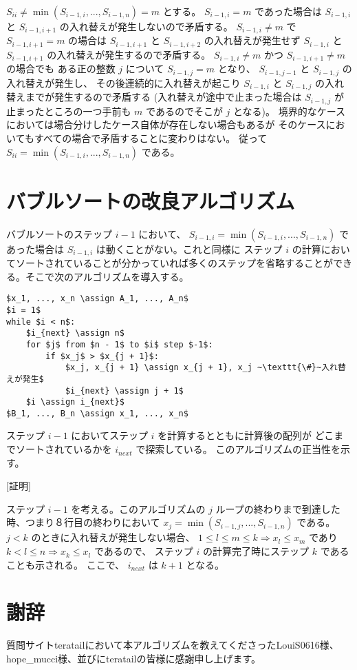 \documentclass{jsarticle}
\begin{document}
$S_{ii} \ne \min (S_{i-1, i}, ..., S_{i-1, n}) = m$ とする。
$S_{i-1, i} = m$ であった場合は
$S_{i-1, i}$ と $S_{i-1, i+1}$ の入れ替えが発生しないので矛盾する。
$S_{i-1, i} \ne m$ で $S_{i-1, i+1} = m$ の場合は
$S_{i-1, i+1}$ と $S_{i-1, i+2}$ の入れ替えが発生せず
$S_{i-1, i}$ と $S_{i-1, i+1}$ の入れ替えが発生するので矛盾する。
$S_{i-1, i} \ne m$ かつ $S_{i-1, i+1} \ne m$ の場合でも
ある正の整数 $j$ について $S_{i-1, j} = m$ となり、
$S_{i-1, j-1}$ と $S_{i-1, j}$ の入れ替えが発生し、
その後連続的に入れ替えが起こり
$S_{i-1, i}$ と $S_{i-1, j}$ の入れ替えまでが発生するので矛盾する
(入れ替えが途中で止まった場合は $S_{i-1, j}$ が止まったところの一つ手前も
$m$ であるのでそこが $j$ となる)。
境界的なケースにおいては場合分けしたケース自体が存在しない場合もあるが
そのケースにおいてもすべての場合で矛盾することに変わりはない。
従って $S_{ii} = \min (S_{i-1, i}, ..., S_{i-1, n})$ である。

\section{バブルソートの改良アルゴリズム}

バブルソートのステップ $i-1$ において、
$S_{i-1, i} = \min (S_{i-1,i}, ..., S_{i-1, n})$ であった場合は
$S_{i-1, i}$ は動くことがない。これと同様に
ステップ $i$ の計算においてソートされていることが分かっていれば多くのステップを省略することができる。そこで次のアルゴリズムを導入する。

\begin{lstlisting}[mathescape]
$x_1, ..., x_n \assign A_1, ..., A_n$
$i = 1$
while $i < n$:
    $i_{next} \assign n$
    for $j$ from $n - 1$ to $i$ step $-1$:
        if $x_j$ > $x_{j + 1}$:
            $x_j, x_{j + 1} \assign x_{j + 1}, x_j ~\texttt{\#}~入れ替えが発生$
            $i_{next} \assign j + 1$
    $i \assign i_{next}$
$B_1, ..., B_n \assign x_1, ..., x_n$
\end{lstlisting}

ステップ $i-1$ においてステップ $i$ を計算するとともに計算後の配列が
どこまでソートされているかを $i_{next}$ で探索している。
このアルゴリズムの正当性を示す。

[証明]

ステップ $i-1$ を考える。このアルゴリズムの $j$ ループの終わりまで到達した時、つまり８行目の終わりにおいて $x_j = \min (S_{i-1,j}, ..., S_{i-1,n})$ である。
$j < k$ のときに入れ替えが発生しない場合、
$1 \le l \le m \le k \Longrightarrow x_l \le x_m$ であり
$k < l \le n \Longrightarrow x_k \le x_l$ であるので、
ステップ $i$ の計算完了時にステップ $k$ であることも示される。
ここで、 $i_{next}$ は $k + 1$ となる。

\section*{謝辞}

質問サイトteratailにおいて本アルゴリズムを教えてくださったLouiS0616様、hope\_mucci様、並びにteratailの皆様に感謝申し上げます。
\end{document}
